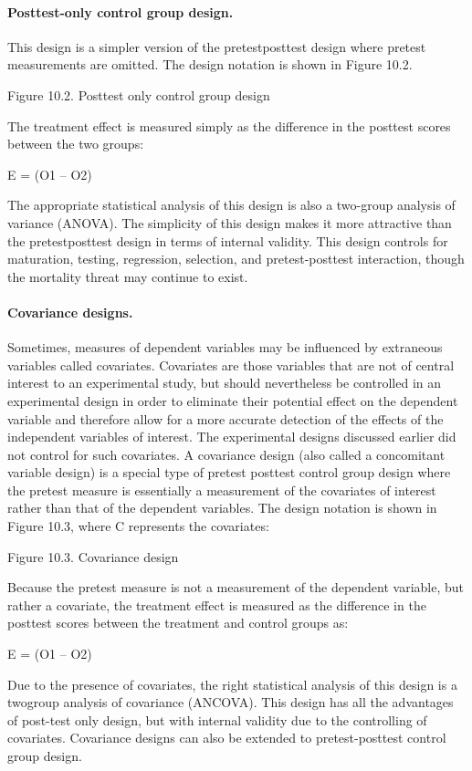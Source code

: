 \paragraph{Posttest-only control group design.} This design is a simpler version of the pretestposttest design where pretest measurements are omitted. The design notation is shown in Figure 10.2.

Figure 10.2. Posttest only control group design

The treatment effect is measured simply as the difference in the posttest scores between the two groups:

E = (O1 – O2)

The appropriate statistical analysis of this design is also a two-group analysis of variance (ANOVA). The simplicity of this design makes it more attractive than the pretestposttest design in terms of internal validity. This design controls for maturation, testing, regression, selection, and pretest-posttest interaction, though the mortality threat may continue to exist.

\paragraph{Covariance designs.} Sometimes, measures of dependent variables may be influenced by extraneous variables called covariates. Covariates are those variables that are not of central interest to an experimental study, but should nevertheless be controlled in an experimental design in order to eliminate their potential effect on the dependent variable and therefore allow for a more accurate detection of the effects of the independent variables of interest. The experimental designs discussed earlier did not control for such covariates. A covariance design (also called a concomitant variable design) is a special type of pretest posttest control group design where the pretest measure is essentially a measurement of the covariates of interest rather than that of the dependent variables. The design notation is shown in Figure 10.3, where C represents the covariates:

Figure 10.3. Covariance design

Because the pretest measure is not a measurement of the dependent variable, but rather a covariate, the treatment effect is measured as the difference in the posttest scores between the treatment and control groups as:

E = (O1 – O2)

Due to the presence of covariates, the right statistical analysis of this design is a twogroup analysis of covariance (ANCOVA). This design has all the advantages of post-test only design, but with internal validity due to the controlling of covariates. Covariance designs can also be extended to pretest-posttest control group design.

